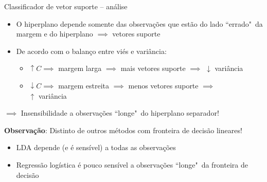 

\begin{frame}{Classificador de vetor suporte -- análise}
    \begin{itemize}
        \item O hiperplano depende somente das observações que estão do lado ``errado"~da margem e do hiperplano $\implies$ \alert{vetores suporte}
        
        \pause
        
        \item De acordo com o balanço entre viés e variância:
        \begin{itemize}
            \item $\uparrow C \implies$ margem larga $\implies$ mais vetores suporte $\implies$ $\downarrow$ variância
            
            \pause
            
            \item $\downarrow C \implies$ margem estreita $\implies$ menos vetores suporte $\implies$ \\ $\uparrow$ variância
        \end{itemize}
    \end{itemize}
    
    \pause
    
    \begin{center}
        $\implies$ Insensibilidade a observações ``longe"~do hiperplano separador!
    \end{center}
    
    \pause
    
    \textbf{Observação}: Distinto de outros métodos com fronteira de decisão lineares!
    
    \pause
    
    \begin{itemize}
        \item LDA depende (e é sensível) a todas as observações
        
        \pause
        
        \item Regressão logística é pouco sensível a observações ``longe"~da fronteira de decisão
    \end{itemize}
\end{frame}


